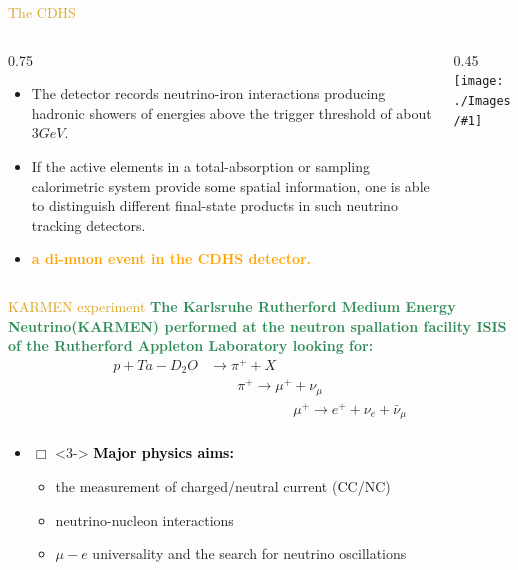 \documentclass[11pt]{beamer} %
\renewcommand{\(}{\begin{columns}}
\renewcommand{\)}{\end{columns}}
\newcommand{\<}[1]{\begin{column}{#1}}
\renewcommand{\>}{\end{column}}
\newcommand{\itt}{\begin{itemize}}
\newcommand{\tti}{\end{itemize}}
\newcommand{\img}[1]{\texttt{[image: ./Images/\#1]}}
\newcommand{\hlt}[2]{\textcolor{#1}{\textbf{#2}}}
\begin{document}
\begin{frame}{\textcolor{Goldenrod}{The CDHS}}

  
  \(
  \<{0.75\textwidth}
\itt
\item<1-> The detector records neutrino-iron interactions producing
  hadronic showers of energies above the trigger threshold of about $3
  GeV$.
\item<2-> \alert{If the active elements in a total-absorption or sampling calorimetric
    system provide some spatial information, one is able to distinguish
    different final-state products in such neutrino tracking detectors.}
\item<3-> \hlt{Orange}{a di-muon event in the CDHS detector.}
  \tti
  \>
  \<{0.45\textwidth}
  \img{CDHS02}
  \>
  \)
\end{frame}



\begin{frame}{\textcolor{Goldenrod}{KARMEN experiment}}
  \hlt{SeaGreen}{The Karlsruhe Rutherford Medium Energy
    Neutrino(KARMEN) performed at the neutron spallation facility ISIS of
    the Rutherford Appleton Laboratory looking for:\\}
  \[
    \begin{aligned}
      p + Ta-D_2O &\to \pi^+ + X \\
      &\qquad\pi^+ \to \mu^+ +\nu_{\mu}\\
      &\qquad\qquad\qquad\mu^+\to e^+ +\nu_e + \bar{\nu}_{\mu}\\
    \end{aligned}
  \]
  \itt
\item[$\Box$]<3-> \hlt{black}{Major physics aims:}
  \itt
\item<3-> the measurement of charged/neutral current (CC/NC)
\item<3-> neutrino-nucleon interactions
\item<3-> $\mu-e$ universality and the search for neutrino
  oscillations
  \tti
  \tti
\end{frame}
\end{document}
